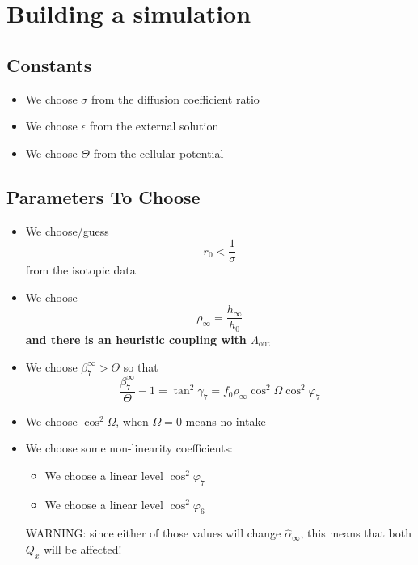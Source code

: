 \documentclass[aps,onecolumn,10pt]{revtex4}
\newcommand{\LiAll}{\Lambda}
\newcommand{\LiAllOut}{{\LiAll}_{\mathrm{out}}}
\begin{document}
\section{Building a simulation}

\subsection{Constants}

\begin{itemize}
	\item We choose $\sigma$ from the diffusion coefficient ratio
	\item We choose $\epsilon$ from the external solution
	\item We choose $\Theta$ from the cellular potential
\end{itemize}


\subsection{Parameters To Choose}
\begin{itemize}
	\item We choose/guess 
	$$r_0<\dfrac{1}{\sigma}$$ 
	from the isotopic data
	
	\item We choose 
	\begin{equation}
		\rho_\infty =  \dfrac{h_\infty}{h_0}
	\end{equation}
	\textbf{and there is an heuristic coupling with $\LiAllOut$}
		
	
	\item We choose $\beta_7^\infty>\Theta$ so that
	\begin{equation}
		\dfrac{\beta_7^\infty}{\Theta}-1 = \tan^2 \gamma_7  = f_0 	\rho_\infty \cos^2\Omega \cos^2\varphi_7
	\end{equation}
	
	
	\item We choose $\cos^2\Omega$, when $\Omega=0$ means no intake 
	
	\item We choose some non-linearity coefficients:
	\begin{itemize}
	
	\item We choose a linear level $\cos^2 \varphi_7$
	
	\item We choose a linear level $\cos^2 \varphi_6$
	
	\end{itemize}	
	WARNING: since either of those values will change $\hat\alpha_\infty$, this means that both $Q_x$ will be affected!

\end{itemize}
\end{document}
